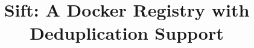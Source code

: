 \documentclass[10pt,twocolumn]{article}
\newcommand{\sysname}{Sift\xspace}
\begin{document}
\title{
\sysname: A Docker Registry with Deduplication Support
}



\date{}
\maketitle












%



{
}
\end{document}
